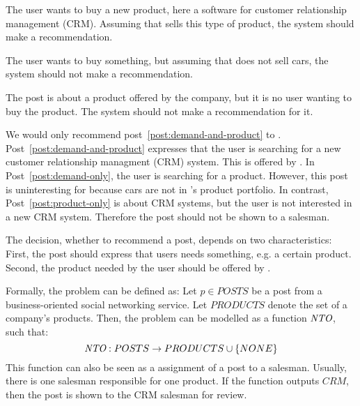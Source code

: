 \begin{post}
	\centering
	\caption{The user wants to buy a new product, here a software for customer relationship management (CRM). Assuming that \acme sells this type of product, the system should make a recommendation.}
	\label{post:demand-and-product}
\end{post}

\begin{post}
	\centering
	\caption{The user wants to buy something, but assuming that \acme does not sell cars, the system should not make a recommendation.}
	\label{post:demand-only}
\end{post}

\begin{post}
	\centering
	\caption{The post is about a product offered by the company, but it is no user wanting to buy the product. The system should not make a recommendation for it.}
	\label{post:product-only}
\end{post}

We would only recommend post~\ref{post:demand-and-product} to \acme.
Post~\ref{post:demand-and-product} expresses that the user is searching for a new customer relationship managment (CRM) system.
This is offered by \acme.
In Post~\ref{post:demand-only}, the user is searching for a product. 
However, this post is uninteresting for \acme because cars are not in \acme's product portfolio. 
In contrast, Post~\ref{post:product-only} is about CRM systems, but the user is not interested in a new CRM system.
Therefore the post should not be shown to a salesman.

The decision, whether to recommend a post, depends on two characteristics:
First, the post should express that users needs something, e.g. a certain product.
Second, the product needed by the user should be offered by \acme.

Formally, the problem can be defined as: 
Let $p \in POSTS$ be a post from a business-oriented social networking service.
Let $PRODUCTS$ denote the set of a company's products.
Then, the problem can be modelled as a function $\emph{NTO}$, such that:
\begin{displaymath}
	\emph{NTO}: POSTS \to PRODUCTS \cup \{NONE\}
\end{displaymath}
This function can also be seen as a assignment of a post to a salesman.
Usually, there is one salesman responsible for one product.
If the \nto function outputs $CRM$, then the post is shown to the CRM salesman for review.

